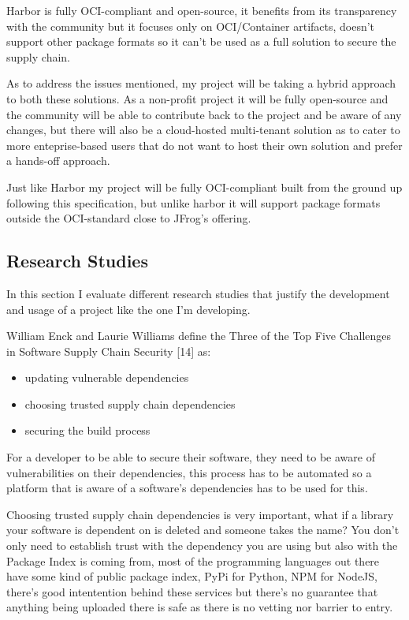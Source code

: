 \documentclass{article}
\begin{document}
  Harbor is fully OCI-compliant and open-source, it benefits from its transparency with the community but it focuses only on OCI/Container artifacts, doesn't support other package formats so it can't be used as a full solution to secure the supply chain.

  As to address the issues mentioned, my project will be taking a hybrid approach to both these solutions. As a non-profit project it will be fully open-source and the community will be able to contribute back to the project and be aware of any changes, but there will also be a cloud-hosted multi-tenant solution as to cater to more enteprise-based users that do not want to host their own solution and prefer a hands-off approach.

  Just like Harbor my project will be fully OCI-compliant built from the ground up following this specification, but unlike harbor it will support package formats outside the OCI-standard close to JFrog's offering.

  \subsection{Research Studies}

  In this section I evaluate different research studies that justify the development and usage of a project like the one I'm developing.
  
  William Enck and Laurie Williams define the Three of the Top Five Challenges in Software Supply Chain Security [14] as:

  \begin{itemize}
    \item updating vulnerable dependencies
    \item choosing trusted supply chain dependencies
    \item securing the build process
  \end{itemize}

  For a developer to be able to secure their software, they need to be aware of vulnerabilities on their dependencies, this process has to be automated so a platform that is aware of a software's dependencies has to be used for this.

  Choosing trusted supply chain dependencies is very important, what if a library your software is dependent on is deleted and someone takes the name? You don't only need to establish trust with the dependency you are using but also with the Package Index is coming from, most of the programming languages out there have some kind of public package index, PyPi for Python, NPM for NodeJS, there's good intentention behind these services but there's no guarantee that anything being uploaded there is safe as there is no vetting nor barrier to entry.
\end{document}
